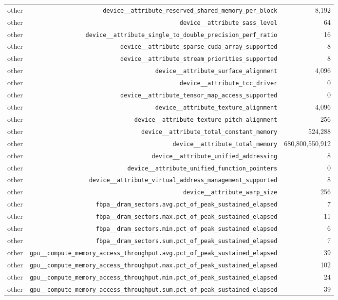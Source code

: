 \begin{table}[h]
\begin{tabular}{|l|r|r|}
other & \texttt{device__attribute_reserved_shared_memory_per_block} & 8,192 \\
other & \texttt{device__attribute_sass_level} & 64 \\
other & \texttt{device__attribute_single_to_double_precision_perf_ratio} & 16 \\
other & \texttt{device__attribute_sparse_cuda_array_supported} & 8 \\
other & \texttt{device__attribute_stream_priorities_supported} & 8 \\
other & \texttt{device__attribute_surface_alignment} & 4,096 \\
other & \texttt{device__attribute_tcc_driver} & 0 \\
other & \texttt{device__attribute_tensor_map_access_supported} & 0 \\
other & \texttt{device__attribute_texture_alignment} & 4,096 \\
other & \texttt{device__attribute_texture_pitch_alignment} & 256 \\
other & \texttt{device__attribute_total_constant_memory} & 524,288 \\
other & \texttt{device__attribute_total_memory} & 680,800,550,912 \\
other & \texttt{device__attribute_unified_addressing} & 8 \\
other & \texttt{device__attribute_unified_function_pointers} & 0 \\
other & \texttt{device__attribute_virtual_address_management_supported} & 8 \\
other & \texttt{device__attribute_warp_size} & 256 \\
other & \texttt{fbpa__dram_sectors.avg.pct_of_peak_sustained_elapsed} & 7 \\
other & \texttt{fbpa__dram_sectors.max.pct_of_peak_sustained_elapsed} & 11 \\
other & \texttt{fbpa__dram_sectors.min.pct_of_peak_sustained_elapsed} & 6 \\
other & \texttt{fbpa__dram_sectors.sum.pct_of_peak_sustained_elapsed} & 7 \\
other & \texttt{gpu__compute_memory_access_throughput.avg.pct_of_peak_sustained_elapsed} & 39 \\
other & \texttt{gpu__compute_memory_access_throughput.max.pct_of_peak_sustained_elapsed} & 102 \\
other & \texttt{gpu__compute_memory_access_throughput.min.pct_of_peak_sustained_elapsed} & 24 \\
other & \texttt{gpu__compute_memory_access_throughput.sum.pct_of_peak_sustained_elapsed} & 39 \\

\end{tabular}
\end{table}

